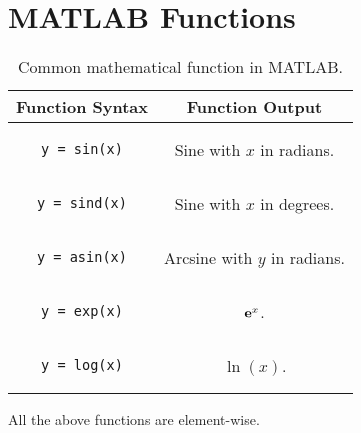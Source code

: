 \documentclass{article}
\begin{document}
\section{MATLAB Functions}
\lstset{language=Matlab}
\begin{table}[H]
    \centering
    \begin{tabular}{c | c}
        \toprule
        Function Syntax & Function Output \\
        \midrule
        \begin{lstlisting}
y = sin(x)
        \end{lstlisting} & Sine with $x$ in radians. \\
        \begin{lstlisting}
y = sind(x)
        \end{lstlisting} & Sine with $x$ in degrees. \\
        \begin{lstlisting}
y = asin(x)
        \end{lstlisting} & Arcsine with $y$ in radians. \\
        \begin{lstlisting}
y = exp(x)
        \end{lstlisting} & $\mathbf{e}^x$. \\
        \begin{lstlisting}
y = log(x)
        \end{lstlisting} & $\ln{\left( x \right)}$. \\
        \bottomrule
    \end{tabular}
    \caption{Common mathematical function in MATLAB.}
\end{table}
All the above functions are element-wise.
\end{document}
